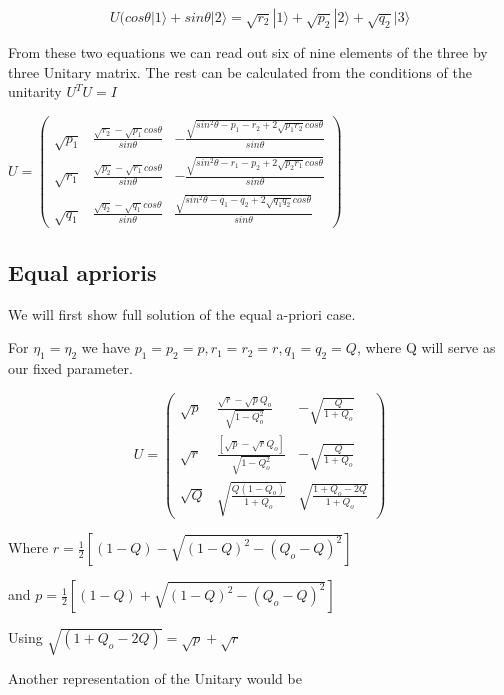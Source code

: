 \documentclass[12pt,oneside,english,reqno]{amsbook}
\numberwithin{section}{chapter}
\numberwithin{equation}{section}
\numberwithin{figure}{section}
\begin{document}
\begin{equation}
U(cos\theta|1\rangle+sin\theta|2\rangle=\sqrt{r_{2}}|1\rangle+\sqrt{p_{2}}|2\rangle+\sqrt{q_{2}}|3\rangle
\end{equation}


From these two equations we can read out six of nine elements of the
three by three Unitary matrix. The rest can be calculated from the
conditions of the unitarity $U^{T}U=I$ 

$ $$U=\begin{pmatrix}\sqrt{p_{1}} & \frac{\sqrt{r_{2}}-\sqrt{p_{1}}cos\theta}{sin\theta} & -\frac{\sqrt{sin^{2}\theta-p_{1}-r_{2}+2\sqrt{p_{1}r_{2}}cos\theta}}{sin\theta}\\
\sqrt{r_{1}} & \frac{\sqrt{p_{2}}-\sqrt{r_{1}}cos\theta}{sin\theta} & -\frac{\sqrt{sin^{2}\theta-r_{1}-p_{2}+2\sqrt{p_{2}r_{1}}cos\theta}}{sin\theta}\\
\sqrt{q_{1}} & \frac{\sqrt{q_{2}}-\sqrt{q_{1}}cos\theta}{sin\theta} & \frac{\sqrt{sin^{2}\theta-q_{1}-q_{2}+2\sqrt{q_{1}q_{2}}cos\theta}}{sin\theta}
\end{pmatrix}$


\subsection{Equal aprioris}

We will first show full solution of the equal a-priori case. 

For $\eta_{1}=\eta_{2}$ we have $p_{1}=p_{2}=p,r_{1}=r_{2}=r,q_{1}=q_{2}=Q$,
where Q will serve as our fixed parameter. 

\begin{equation}
U=\begin{pmatrix}\sqrt{p} & \frac{\sqrt{r}-\sqrt{p}Q_{o}}{\sqrt{1-Q_{o}^{2}}} & -\sqrt{\frac{Q}{1+Q_{o}}}\\
\sqrt{r} & \frac{[\sqrt{p}-\sqrt{r}Q_{o}]}{\sqrt{1-Q_{o}^{2}}} & -\sqrt{\frac{Q}{1+Q_{o}}}\\
\sqrt{Q} & \sqrt{\frac{Q(1-Q_{o})}{1+Q_{o}}} & \sqrt{\frac{1+Q_{o}-2Q}{1+Q_{o}}}
\end{pmatrix}
\end{equation}


Where $r=\frac{1}{2}[(1-Q)-\sqrt{(1-Q)^{2}-(Q_{o}-Q)^{2}}]$

and $p=\frac{1}{2}[(1-Q)+\sqrt{(1-Q)^{2}-(Q_{o}-Q)^{2}}]$

Using $\sqrt{(1+Q_{o}-2Q)}=\sqrt{p}+\sqrt{r}$ 

Another representation of the Unitary would be
\end{document}
